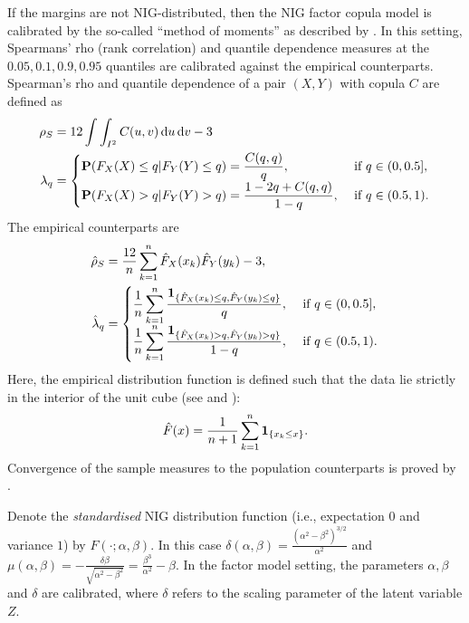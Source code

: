 If the margins are not NIG-distributed, then the NIG factor copula
model is calibrated by the so-called ``method of moments'' as
described by \citep{Oh2013}. In this setting, Spearmans' rho (rank
correlation) and quantile dependence measures at the $0.05, 0.1, 0.9,
0.95$ quantiles are calibrated against the empirical
counterparts. Spearman's rho and quantile dependence of a pair $(X,Y)$
with copula $C$ are defined as 
\begin{align}
  \rho_S &= 12 \int\int_{I^2} C(u,v)\, {\rm d} u\, {\rm d} v-3\label{eq:10}\\
  \lambda_q &=
  \begin{cases}
    {\bf P}(F_X(X)\leq q| F_Y(Y)\leq q) = \displaystyle \frac{C(q,q)}{q},
    &\text{ if } q\in (0,0.5],\\
    {\bf P}(F_X(X)>q|F_Y(Y)>q) =\displaystyle \frac{1-2q+C(q,q)} {1-q},
    &\text{ if } q\in (0.5,1). 
  \end{cases}
\end{align}
The empirical counterparts are
\begin{align*}
  \hat\rho_S &= \frac{12}{n} \sum_{k=1}^n \hat F_X(x_k) \hat F_Y(y_k)
               -3,\\
  \hat\lambda_q &=
                  \begin{cases}
                    \displaystyle\frac{1}{n} \sum_{k=1}^n \frac{\textbf{1}_{\{\hat
                        F_X(x_k)\leq q, \hat F_Y(y_k)\leq q\}}} {q},
                    &\text { if } q\in (0, 0.5],\\
                    \displaystyle \frac{1}{n} \sum_{k=1}^n
                    \frac{\textbf{1}_{\{\hat F_X(x_k)>q, \hat F_Y(y_k)>q\}}}
                    {1-q}, &\text { if } q\in (0.5,1). 
                  \end{cases}
\end{align*}
Here, the empirical distribution function is defined such that the
data lie strictly in the interior of the unit cube (see \citep{Oh2013}
and \citep[p.\ 232]{McNeil2005}):
\begin{equation*}
  \hat F(x) = \frac{1}{n+1} \sum_{k=1}^n \textbf{1}_{\{x_k\leq x\}}. 
\end{equation*}
Convergence of the sample measures to the population counterparts is
proved by \citep{Fermanian2004}.

Denote the {\em standardised\/} NIG distribution function (i.e.,
expectation $0$ and variance $1$) by $F(\cdot; \alpha, \beta)$. In this case
$\delta(\alpha,\beta)=\displaystyle\frac{(\alpha^2-\beta^2)^{3/2}}{\alpha^2}$
and $\mu(\alpha,\beta)=\displaystyle - \frac{\delta \beta}
{\sqrt{\alpha^2-\beta^2}} = \frac{\beta^3}{\alpha^2} -\beta$. In the
factor model setting, the parameters $\alpha, \beta$ and $\delta$ are
calibrated, where $\delta$ refers to the scaling parameter of the
latent variable $Z$. 



